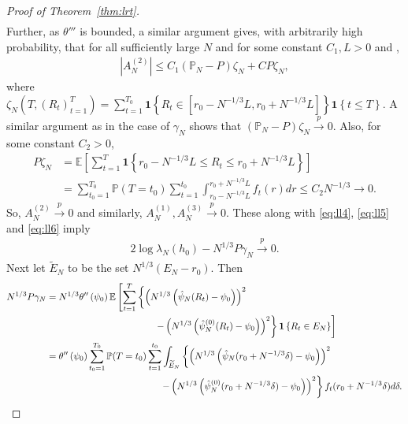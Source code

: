 \documentclass[12pt]{amsart}
\theoremstyle{plain}
\theoremstyle{remark}
\numberwithin{equation}{section}
\begin{document}
\begin{proof}[Proof of Theorem~\ref{thm:lrt}]
\begin{align}
\end{align}
Further, as $\theta'''$ is bounded, a similar argument gives,  with arbitrarily high probability, that for all sufficiently large $N$ and for some constant $C_1, L > 0$ and ,
\begin{align*}
    \left|A^{(2)}_N\right| \leq C_1 (\mathbb{P}_N-P)\zeta_{N} + CP\zeta_{N},
\end{align*}
where $\zeta_{N}(T, (R_t)_{t=1}^{T}) = \sum_{t=1}^{T_0}\mathbf{1}\left\{R_t \in[r_0 - N^{-1/3}L, r_0 + N^{-1/3}L]\right\}\mathbf{1}\left\{t \leq T\right\}$. A similar argument as in the case of $\gamma_N$ shows that $(\mathbb{P}_N-P)\zeta_{N} \stackrel{p}{\to} 0$. Also, for some constant $C_2 > 0$,
\begin{align*}
P\zeta_{N} &= \mathbb{E}\left[\sum_{t=1}^{T}\mathbf{1}\left\{r_0 - N^{-1/3}L \leq R_{t} \le r_0+N^{-1/3}L\right\}\right] \nonumber
\\ &= \sum_{t_0=1}^{T_0}\mathbb{P}(T=t_0)\sum_{t=1}^{t_0}\int_{r_0 - N^{-1/3}L}^{r_0+N^{-1/3}L}f_t(r)dr \leq C_2N^{-1/3} \to 0.
\end{align*}
So, $A^{(2)}_N \stackrel{p}{\to} 0$ and similarly, $A^{(1)}_N, A^{(3)}_N\stackrel{p}{\to} 0$. These along with \eqref{eq:ll4}, \eqref{eq:ll5} and \eqref{eq:ll6} imply
\begin{align}\label{eq:ll7}
    2 \log \lambda_{N}(h_0) - N^{1/3}P\gamma_{N} \stackrel{p}{\to} 0.
\end{align}
Next let $\widetilde{E}_{N}$ to be the set $N^{1 / 3}\left(E_{N}-r_{0}\right)$. Then
\begin{align}\label{eq:ll8}
    N^{1/3}P\gamma_{N} &= N^{1/3}\theta''\left(\psi_0\right)\mathbb{E}\left[\sum_{t=1}^{T}\left\{\left(N^{1/3}\left(\hat{\psi}_{N}(R_t)-\psi_0\right)\right)^{2} \right.\right. \nonumber \\ &\hspace{4cm}\left.\left. -\left(N^{1/3}\left(\hat{\psi}_{N}^{(0)}(R_t)-\psi_0\right)\right)^{2}\right\}\mathbf{1}\left\{R_t \in E_{N}\right\}\right] \nonumber \\
    &= \theta''\left(\psi_0\right)\sum_{t_0=1}^{T_0}\mathbb{P}(T=t_0)\sum_{t=1}^{t_0}\int_{\widetilde{E}_{N}}\left\{\left(N^{1/3}\left(\hat{\psi}_{N}(r_0 + N^{-1/3}\delta)-\psi_0\right)\right)^{2} \right. \\ &\hspace{4.25cm}\left. -\left(N^{1/3}\left(\hat{\psi}_{N}^{(0)}(r_0 + N^{-1/3}\delta)-\psi_0\right)\right)^{2}\right\}f_t(r_0 + N^{-1/3}\delta)d\delta. \nonumber 
\end{align}

\end{proof}
\end{document}

